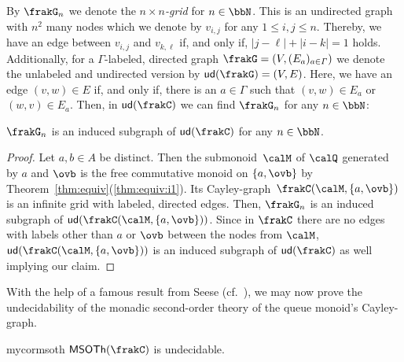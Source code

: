 By $\frakG_n$ we denote the \emph{$n\times n$-grid} for $n\in\bbN$. This is an undirected graph with $n^2$ many nodes which we denote by $v_{i,j}$ for any $1\leq i,j\leq n$. Thereby, we have an edge between $v_{i,j}$ and $v_{k,\ell}$ if, and only if, $|j-\ell|+|i-k|=1$ holds.
Additionally, for a $\varGamma$-labeled, directed graph $\frakG=(V,(E_a)_{a\in\varGamma})$ we denote the unlabeled and undirected version by $\ud{\frakG}=(V,E)$. Here, we have an edge $(v,w)\in E$ if, and only if, there is an $a\in\varGamma$ such that $(v,w)\in E_a$ or $(w,v)\in E_a$. Then, in $\ud{\cQ}$ we can find $\frakG_n$ for any $n\in\bbN$:

\begin{proposition}\label{prop:grid}
	$\frakG_n$ is an induced subgraph of $\ud{\cQ}$ for any $n\in\bbN$.
\end{proposition}
\begin{proof}
	Let $a,b\in A$ be distinct. Then the submonoid~$\calM$ of $\Qx$ generated by $a$ and $\ovb$ is the free commutative monoid on $\{a,\ovb\}$ by Theorem~\ref{thm:equiv}(\ref{thm:equiv:i1}). Its Cayley-graph~$\cayley{\calM}{\{a,\ovb\}}$ is an infinite grid with labeled, directed edges. %
	Then, $\frakG_n$ is an induced subgraph of $\ud{\cayley{\calM}{\{a,\ovb\}}}$. Since in $\cQ$ there are no edges with labels other than $a$ or $\ovb$ between the nodes from $\calM$, $\ud{\cayley{\calM}{\{a,\ovb\}}}$ is an induced subgraph of $\ud{\cQ}$ as well implying our claim.
\end{proof}

%		

With the help of a famous result from Seese (cf.~\cite{See91}), we may now prove the undecidability of the monadic second-order theory of the queue monoid's Cayley-graph.

\begin{restatable}{mycor}{msoth}
	$\MSOTh{\cQ}$ is undecidable.
\end{restatable}
